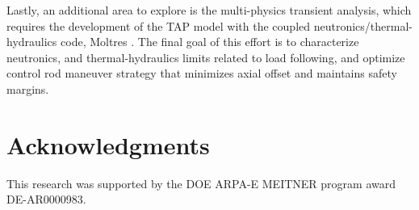 \documentclass{anstrans}
\begin{document}
Lastly, an additional area to explore is the multi-physics transient analysis, 
which requires the development of the \gls{TAP} model with the coupled 
neutronics/thermal-hydraulics code, Moltres \cite{lindsay_introduction_2018}. 
The final goal of this effort is to characterize neutronics, and 
thermal-hydraulics limits related to load following, and optimize control rod 
maneuver strategy that minimizes axial offset and maintains safety margins.

\section{Acknowledgments}
This research was supported by the DOE ARPA-E MEITNER program award 
DE-AR0000983.


\end{document}

